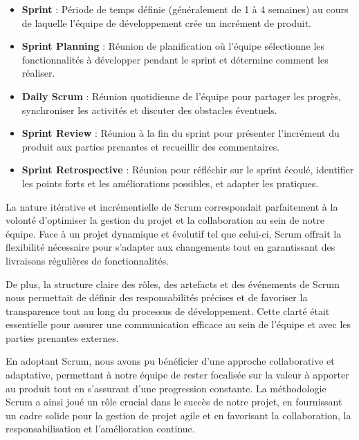 \begin{itemize}
    \item \textbf{Sprint} : Période de temps définie (généralement de 1 à 4 semaines) au cours de laquelle l'équipe de développement crée un incrément de produit.

    \item \textbf{Sprint Planning} : Réunion de planification où l'équipe sélectionne les fonctionnalités à développer pendant le sprint et détermine comment les réaliser.

    \item \textbf{Daily Scrum} : Réunion quotidienne de l'équipe pour partager les progrès, synchroniser les activités et discuter des obstacles éventuels.

    \item \textbf{Sprint Review} : Réunion à la fin du sprint pour présenter l'incrément du produit aux parties prenantes et recueillir des commentaires.

    \item \textbf{Sprint Retrospective} : Réunion pour réfléchir sur le sprint écoulé, identifier les points forts et les améliorations possibles, et adapter les pratiques.


\end{itemize}


La nature itérative et incrémentielle de Scrum correspondait parfaitement à la volonté d'optimiser la gestion du projet et la collaboration au sein de notre équipe. Face à un projet dynamique et évolutif tel que celui-ci, Scrum offrait la flexibilité nécessaire pour s'adapter aux changements tout en garantissant des livraisons régulières de fonctionnalités.

De plus, la structure claire des rôles, des artefacts et des événements de Scrum nous permettait de définir des responsabilités précises et de favoriser la transparence tout au long du processus de développement. Cette clarté était essentielle pour assurer une communication efficace au sein de l'équipe et avec les parties prenantes externes.

En adoptant Scrum, nous avons pu bénéficier d'une approche collaborative et adaptative, permettant à notre équipe de rester focalisée sur la valeur à apporter au produit tout en s'assurant d'une progression constante. La méthodologie Scrum a ainsi joué un rôle crucial dans le succès de notre projet, en fournissant un cadre solide pour la gestion de projet agile et en favorisant la collaboration, la responsabilisation et l'amélioration continue.


